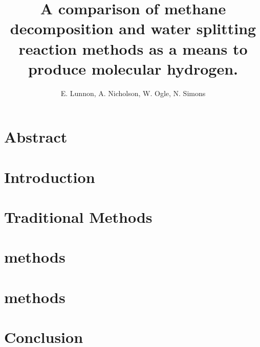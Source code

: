 \documentclass[a4paper]{article}
\title{A comparison of methane decomposition and water splitting reaction methods as a means to produce molecular hydrogen.}
\author{E. Lunnon, A. Nicholson, W. Ogle, N. Simons}
\begin{document}
\maketitle
\tableofcontents
\clearpage

\section*{Abstract}%
\label{sec:abstract}



\begin{multicols}{2}
\section{Introduction}%
\label{sec:introduction}


\section{Traditional Methods}%
\label{sub:Traditional_Methods}


\section{ methods}%
\label{sub:ch4_methods}


\section{ methods}%
\label{sub:h2o_methods}


\section{Conclusion}%
\label{sec:conclusion}


%



\end{multicols}
\end{document}
